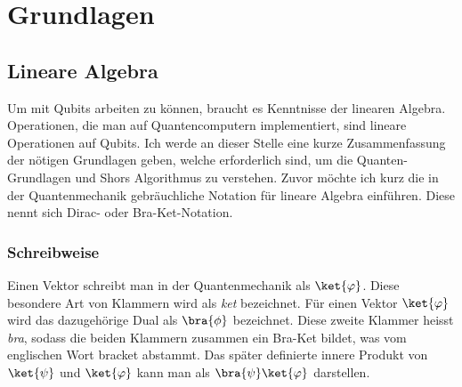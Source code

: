\chapter{Grundlagen}
\section{Lineare Algebra}
Um mit Qubits arbeiten zu können, braucht es Kenntnisse der linearen Algebra. Operationen, die man auf Quantencomputern implementiert, sind lineare Operationen auf Qubits. Ich werde an dieser Stelle eine kurze Zusammenfassung der nötigen Grundlagen geben, welche erforderlich sind, um die Quanten-Grundlagen und Shors Algorithmus zu verstehen. Zuvor möchte ich kurz die in der Quantenmechanik gebräuchliche Notation für lineare Algebra einführen. Diese nennt sich Dirac- oder Bra-Ket-Notation. 

\subsection{Schreibweise}
Einen Vektor schreibt man in der Quantenmechanik als $\ket{\varphi}$. Diese besondere Art von Klammern wird als \textit{ket} bezeichnet. Für einen Vektor $\ket{\varphi}$ wird das dazugehörige Dual als $\bra{\phi}$ bezeichnet. Diese zweite Klammer heisst \textit{bra}, sodass die beiden Klammern zusammen ein Bra-Ket bildet, was vom englischen Wort bracket abstammt. Das später definierte innere Produkt von $\ket{\psi}$ und $\ket{\varphi}$ kann man als $\bra{\psi}\ket{\varphi}$ darstellen.

